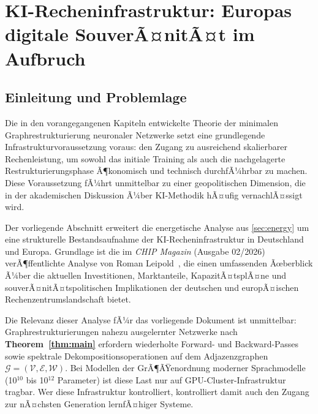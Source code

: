 ﻿\documentclass[12pt, a4paper, openany]{report}
\newcommand{\calG}{\mathcal{G}}
\newcommand{\calV}{\mathcal{V}}
\newcommand{\calE}{\mathcal{E}}
\newcommand{\calW}{\mathcal{W}}
\begin{document}
\chapter{KI-Recheninfrastruktur: Europas digitale SouverÃ¤nitÃ¤t im Aufbruch}
\label{sec:ki_infrastruktur}

\section{Einleitung und Problemlage}

Die in den vorangegangenen Kapiteln entwickelte Theorie der minimalen
Graphrestrukturierung neuronaler Netzwerke setzt eine grundlegende
Infrastrukturvoraussetzung voraus: den Zugang zu ausreichend skalierbarer
Rechenleistung, um sowohl das initiale Training als auch die nachgelagerte
Restrukturierungsphase Ã¶konomisch und technisch durchfÃ¼hrbar zu machen.
Diese Voraussetzung fÃ¼hrt unmittelbar zu einer geopolitischen Dimension, die
in der akademischen Diskussion Ã¼ber KI-Methodik hÃ¤ufig vernachlÃ¤ssigt wird.

Der vorliegende Abschnitt erweitert die energetische Analyse aus
\cref{sec:energy} um eine strukturelle Bestandsaufnahme der
KI-Recheninfrastruktur in Deutschland und Europa. Grundlage ist die im
\textit{CHIP Magazin} (Ausgabe 02/2026) verÃ¶ffentlichte Analyse von Roman
Leipold~\cite{leipold2026chip}, die einen umfassenden Ãœberblick Ã¼ber die
aktuellen Investitionen, Marktanteile, KapazitÃ¤tsplÃ¤ne und
souverÃ¤nitÃ¤tspolitischen Implikationen der deutschen und europÃ¤ischen
Rechenzentrumslandschaft bietet.

Die Relevanz dieser Analyse fÃ¼r das vorliegende Dokument ist unmittelbar:
Graphrestrukturierungen nahezu ausgelernter Netzwerke nach
\textbf{Theorem~\ref{thm:main}} erfordern wiederholte Forward- und
Backward-Passes sowie spektrale Dekompositionsoperationen auf dem
Adjazenzgraphen $\calG = (\calV, \calE, \calW)$. Bei Modellen der GrÃ¶ÃŸenordnung
moderner Sprachmodelle (10$^{10}$ bis 10$^{12}$ Parameter) ist diese Last
nur auf GPU-Cluster-Infrastruktur tragbar. Wer diese Infrastruktur kontrolliert,
kontrolliert damit auch den Zugang zur nÃ¤chsten Generation lernfÃ¤higer Systeme.

\end{document}
